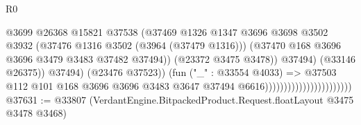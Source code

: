 \begin{lexlean}{R0}
\begin{coremodule}
                                                          @3699
                                                          @26368
                                                          @15821
                                                          @37538
                                                          (@37469
                                                            @1326
                                                            @1347
                                                            @3696
                                                            @3698
                                                            @3502
                                                            @3932
                                                            (@37476
                                                              @1316
                                                              @3502
                                                              (@3964 (@37479 @1316)))
                                                            (@37470
                                                              @168
                                                              @3696
                                                              @3696
                                                              @3479
                                                              @3483
                                                              @37482
                                                              @37494))
                                                          (@23372 @3475 @3478))
                                                        @37494)
                                                      (@33146 @26375))
                                                    @37494)
                                                  (@23476 @37523))
                                                (fun ("_" : @33554 @4033) =>
                                                @37503
                                                  @112
                                                  @101
                                                  @168
                                                  @3696
                                                  @3696
                                                  @3483
                                                  @3647
                                                  @37494
                                                  @6616)))))))))))))))))))))))
@37631 := @33807 (VerdantEngine.BitpackedProduct.Request.floatLayout @3475 @3478 @3468)

\end{coremodule}
\end{lexlean}
